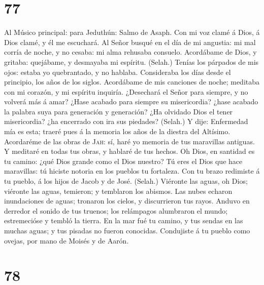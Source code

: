\hypertarget{section-76}{%
\section{77}\label{section-76}}

 Al Músico principal: para Jeduthún: Salmo de Asaph. Con
mi voz clamé á Dios, á Dios clamé, y él me escuchará.  Al
Señor busqué en el día de mi angustia: mi mal corría de noche, y no
cesaba: mi alma rehusaba consuelo.  Acordábame de Dios, y
gritaba: quejábame, y desmayaba mi espíritu. (Selah.) 
Tenías los párpados de mis ojos: estaba yo quebrantado, y no hablaba.
 Consideraba los días desde el principio, los años de los
siglos.  Acordábame de mis canciones de noche; meditaba
con mi corazón, y mi espíritu inquiría.  ¿Desechará el
Señor para siempre, y no volverá más á amar?  ¿Hase
acabado para siempre su misericordia? ¿hase acabado la palabra suya para
generación y generación?  ¿Ha olvidado Dios el tener
misericordia? ¿ha encerrado con ira sus piedades? (Selah.)
 Y dije: Enfermedad mía es esta; traeré pues á la memoria
los años de la diestra del Altísimo.  Acordaréme de las
obras de \textsc{Jah}: sí, haré yo memoria de tus maravillas antiguas.
 Y meditaré en todas tus obras, y hablaré de tus hechos.
 Oh Dios, en santidad es tu camino: ¿qué Dios grande como
el Dios nuestro?  Tú eres el Dios que hace maravillas: tú
hiciste notoria en los pueblos tu fortaleza.  Con tu
brazo redimiste á tu pueblo, á los hijos de Jacob y de José. (Selah.)
 Viéronte las aguas, oh Dios; viéronte las aguas,
temieron; y temblaron los abismos.  Las nubes echaron
inundaciones de aguas; tronaron los cielos, y discurrieron tus rayos.
 Anduvo en derredor el sonido de tus truenos; los
relámpagos alumbraron el mundo; estremecióse y tembló la tierra.
 En la mar fué tu camino, y tus sendas en las muchas
aguas; y tus pisadas no fueron conocidas.  Condujiste á
tu pueblo como ovejas, por mano de Moisés y de Aarón.

\hypertarget{section-77}{%
\section{78}\label{section-77}}

